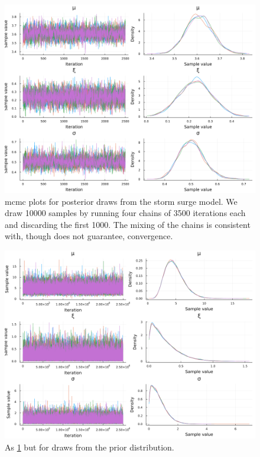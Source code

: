 \documentclass[12pt]{article}
\begin{document}
\begin{figure}
    \centering
    \includegraphics[width=\textwidth]{surge-posterior-chains}
    \caption{
        \Gls{mcmc} plots for posterior draws from the storm surge model.
        We draw \num{10000} samples by running four chains of \num{3500} iterations each and discarding the first \num{1000}.
        The mixing of the chains is consistent with, though does not guarantee, convergence.
    }\label{fig:surge-posterior-chains}
\end{figure}

\begin{figure}
    \centering
    \includegraphics[width=\textwidth]{surge-prior-chains}
    \caption{
        As \cref{fig:surge-posterior-chains} but for draws from the prior distribution.
    }\label{fig:surge-prior-chains}
\end{figure}
\end{document}
